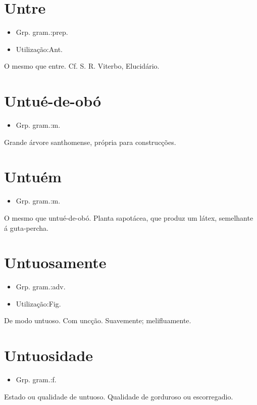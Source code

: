 \documentclass{article}
\begin{document}
\section{Untre}
\begin{itemize}
\item {Grp. gram.:prep.}
\end{itemize}
\begin{itemize}
\item {Utilização:Ant.}
\end{itemize}
O mesmo que \textunderscore entre\textunderscore . Cf. S. R. Viterbo, \textunderscore Elucidário\textunderscore .
\section{Untué-de-obó}
\begin{itemize}
\item {Grp. gram.:m.}
\end{itemize}
Grande árvore santhomense, própria para construcções.
\section{Untuém}
\begin{itemize}
\item {Grp. gram.:m.}
\end{itemize}
O mesmo que \textunderscore untué-de-obó\textunderscore .
Planta sapotácea, que produz um látex, semelhante á guta-percha.
\section{Untuosamente}
\begin{itemize}
\item {Grp. gram.:adv.}
\end{itemize}
\begin{itemize}
\item {Utilização:Fig.}
\end{itemize}
De modo untuoso.
Com uncção.
Suavemente; melifluamente.
\section{Untuosidade}
\begin{itemize}
\item {Grp. gram.:f.}
\end{itemize}
Estado ou qualidade de untuoso.
Qualidade de gorduroso ou escorregadio.
\end{document}
